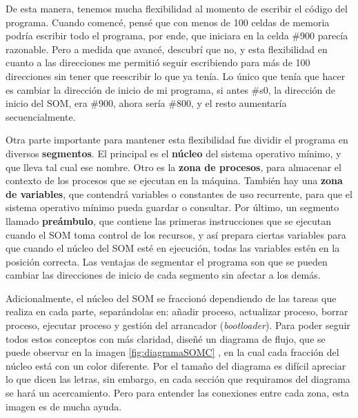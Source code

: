 \documentclass[letterpaper,12pt,oneside]{book}
\begin{document}
        De esta manera, tenemos mucha flexibilidad al momento de escribir
		el código del programa. Cuando comencé, pensé que con menos de 100 celdas de memoria podría escribir todo el programa, por ende, que iniciara
		en la celda \#900 parecía razonable. Pero a medida que avancé,
		descubrí que no, y esta flexibilidad en cuanto a las direcciones me permitió seguir escribiendo para más de 100 direcciones sin tener que reescribir
		lo que ya tenía. Lo único que tenía que hacer es cambiar la dirección de inicio de mi programa, si antes \#s0, la dirección de inicio del SOM,
		era \#900, ahora sería \#800, y el resto aumentaría secuencialmente.
		
		Otra parte importante para mantener esta flexibilidad fue dividir el programa en diversos \textbf{segmentos}. El principal es el \textbf{núcleo} 
		del
		sistema operativo mínimo, y que lleva tal cual ese nombre. Otro es la \textbf{zona de procesos}, para almacenar el contexto de los
		procesos que se ejecutan en la máquina. También hay una \textbf{zona de variables}, que contendrá variables o constantes de uso 
		recurrente,
		para que el sistema operativo mínimo pueda guardar o consultar. Por último, un segmento llamado \textbf{preámbulo}, que contiene las primeras 
		instrucciones
		que se ejecutan cuando el SOM toma control de los recursos, y así prepara ciertas variables para que cuando el núcleo del SOM esté en ejecución,
		todas las variables estén en la posición correcta. Las ventajas de segmentar el programa son que se pueden cambiar las direcciones de inicio de 
		cada segmento sin afectar a los demás.

		
		Adicionalmente, el núcleo del SOM se fraccionó dependiendo de las tareas que realiza en cada parte, separándolas en:
		añadir proceso, actualizar proceso, borrar proceso, ejecutar proceso y gestión del arrancador (\textit{bootloader}). Para poder seguir todos 
		estos conceptos con más claridad,
		  diseñé un diagrama de flujo, que se puede observar en la imagen \ref{fig:diagramaSOMC}
		, en la cual cada fracción del núcleo está con un color diferente. Por el tamaño del diagrama es difícil apreciar lo que dicen las letras, sin embargo,
		en cada sección que requiramos del diagrama se hará un acercamiento. Pero para entender
		las conexiones entre cada zona, esta imagen es de mucha ayuda.
		
\end{document}

